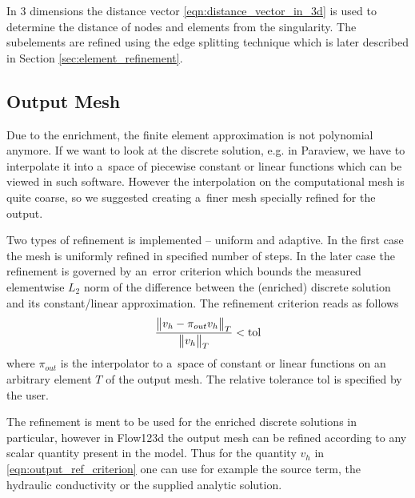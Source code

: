 In 3 dimensions the distance vector \eqref{eqn:distance_vector_in_3d} is used to determine the distance of nodes and elements from the singularity.
The subelements are refined using the edge splitting technique which is later described in Section \ref{sec:element_refinement}.

\subsection{Output Mesh}
\label{sec:output_mesh}

Due to the enrichment, the finite element approximation is not polynomial anymore.
If we want to look at the discrete solution, e.g. in Paraview, we have to interpolate it into a~space of piecewise
constant or linear functions which can be viewed in such software. However the interpolation on the computational mesh
is quite coarse, so we suggested creating a~finer mesh specially refined for the output.

Two types of refinement is implemented -- uniform and adaptive. In the first case the mesh is uniformly refined in
specified number of steps. In the later case the refinement is governed by an~error criterion which bounds 
the measured elementwise $L_2$ norm of the difference between the (enriched) discrete solution and its constant/linear approximation.
The refinement criterion reads as follows
\begin{equation} \label{eqn:output_ref_criterion}
    \frac{\bigl\Vert v_h - \pi_{out}v_h\bigr\Vert_{T}}{\bigl\Vert v_h\bigr\Vert_{T}} < \textrm{tol}
\end{equation}
where $\pi_{out}$ is the interpolator to a~space of constant or linear functions on an arbitrary element $T$ of the output mesh.
The relative tolerance $\textrm{tol}$ is specified by the user.

The refinement is ment to be used for the enriched discrete solutions in particular, however in Flow123d the output mesh can be refined
according to any scalar quantity present in the model. Thus for the quantity $v_h$ in \eqref{eqn:output_ref_criterion} one can use
for example the source term, the hydraulic conductivity or the supplied analytic solution.

